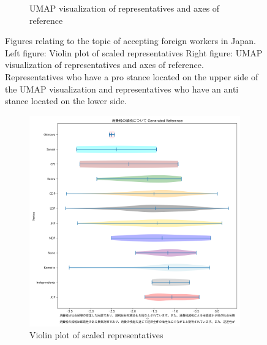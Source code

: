\documentclass[final,5p,times,twocolumn,authoryear]{elsarticle}
\begin{document}
\begin{figure}[h]
\begin{subfigure}{0.22\textwidth}
      \caption{UMAP visualization of representatives and axes of reference}
    \end{subfigure}
\caption{Figures relating to the topic of accepting foreign workers in Japan. Left figure: Violin plot of scaled representatives Right figure: UMAP visualization of representatives and axes of reference. Representatives who have a pro stance located on the upper side of the UMAP visualization and representatives who have an anti stance located on the lower side.}
\label{fig: results-economy-foreign}
\end{figure}

\begin{figure}[h]
\centering
    \begin{subfigure}{0.22\textwidth}
      \centering
      \includegraphics[width=1\linewidth]{figs/results/economy/消費税の減税について_gen_violin_plot.png}
      \caption{Violin plot of scaled representatives}
    \end{subfigure}
    \begin{subfigure}{0.22\textwidth}
      \centering

\end{subfigure}
\end{figure}
\end{document}
